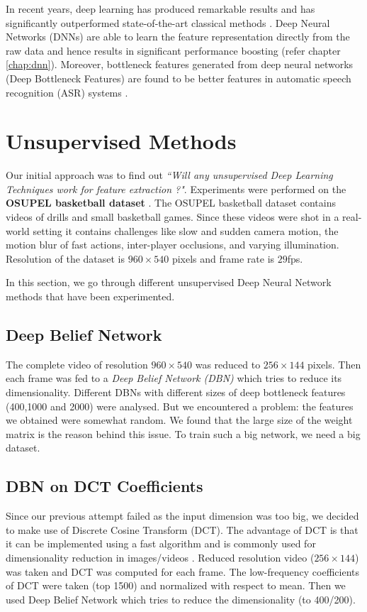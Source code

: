 In recent years, deep learning has produced remarkable results and has significantly outperformed state-of-the-art classical methods \cite{KarpathyCVPR14}. Deep Neural Networks (DNNs) are able to learn the feature representation directly from the raw data and hence results in significant performance boosting (refer chapter \ref{chap:dnn}). Moreover, bottleneck features generated from deep neural networks (Deep Bottleneck Features) are found to be better features in automatic speech recognition (ASR) systems \cite{yu2011improved,gehring2013extracting}.

\section{Unsupervised Methods}
\label{sec:event:unsupervised}
Our initial approach was to find out \textit{``Will any unsupervised Deep Learning Techniques work for feature extraction ?"}. Experiments were performed on the \textbf{OSUPEL basketball dataset} \cite{brendel2011probabilistic}. The OSUPEL basketball dataset contains videos of drills and small basketball games. Since these videos were shot in a real-world setting it contains challenges like slow and sudden camera motion, the motion blur of fast actions, inter-player occlusions, and varying illumination. Resolution of the dataset is $960 \times 540$ pixels and frame rate is $29$fps.

In this section, we go through different unsupervised Deep Neural Network methods that have been experimented. 

\subsection{Deep Belief Network} 
The complete video of resolution $960 \times 540$ was reduced to $256 \times 144$ pixels. Then each frame was fed to a \textit{Deep Belief Network (DBN)} which tries to reduce its dimensionality. Different DBNs with different sizes of deep bottleneck features (400,1000 and 2000) were analysed. But we encountered a problem: the features we obtained were somewhat random. We found that the large size of the weight matrix is the reason behind this issue. To train such a big network, we need a big dataset.

\subsection{DBN on DCT Coefficients}
Since our previous attempt failed as the input dimension was too big, we decided to make use of Discrete Cosine Transform (DCT). The advantage of DCT is that it can be implemented using a fast algorithm and is commonly used for dimensionality reduction in images/videos \cite{er2005high}. Reduced resolution video ($256 \times 144$) was taken and DCT was computed for each frame. The low-frequency coefficients of DCT were taken (top 1500) and normalized with respect to mean. Then we used Deep Belief Network which tries to reduce the dimensionality (to 400/200).

